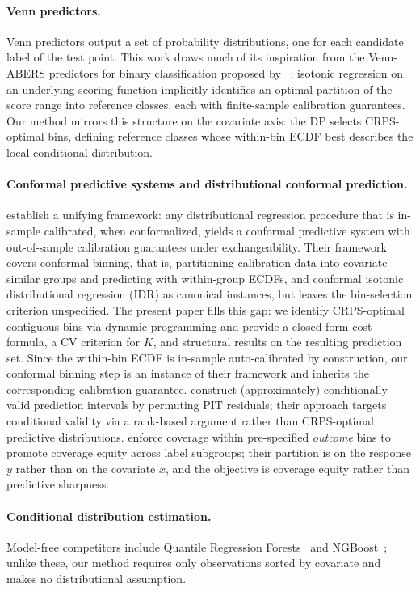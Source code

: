 \documentclass[11pt]{article}
\begin{document}
\paragraph{Venn predictors.}
Venn predictors output a set of probability distributions, one for
each candidate label of the test point.
This work draws much of its inspiration from the Venn-ABERS predictors for binary
classification proposed by ~\citet{VovkPetej2014}: isotonic regression 
on an underlying scoring function implicitly identifies an optimal partition of the 
score range into reference classes, each with finite-sample calibration guarantees.
Our method mirrors this structure on the covariate axis: the DP selects CRPS-optimal
bins, defining reference classes whose within-bin ECDF best describes the local
conditional distribution.

\paragraph{Conformal predictive systems and distributional conformal prediction.}
\citet{AllenEtAl2025} establish a unifying framework: any distributional
regression procedure that is in-sample calibrated, when conformalized, yields a conformal
predictive system with out-of-sample calibration guarantees under exchangeability.
Their framework covers conformal binning, that is, partitioning calibration data into
covariate-similar groups and predicting with within-group ECDFs, and conformal
isotonic distributional regression (IDR) as canonical instances, but leaves the
bin-selection criterion unspecified.
The present paper fills this gap: we identify CRPS-optimal contiguous bins via
dynamic programming and provide a closed-form cost formula, a CV criterion for $K$,
and structural results on the resulting prediction set.
Since the within-bin ECDF is in-sample auto-calibrated by construction, our
conformal binning step is an instance of their framework and inherits the
corresponding calibration guarantee.
\citet{ChernozhukovEtAl2021} construct (approximately) conditionally
valid prediction intervals by permuting PIT residuals; their approach targets conditional
validity via a rank-based argument rather than CRPS-optimal predictive distributions.
\citet{RandahlEtAl2026} enforce coverage within pre-specified
\emph{outcome} bins to promote coverage equity across label subgroups; their partition
is on the response $y$ rather than on the covariate $x$, and the objective is coverage
equity rather than predictive sharpness.

\paragraph{Conditional distribution estimation.}
Model-free competitors include Quantile Regression Forests~\citep{Meinshausen2006}
and NGBoost~\citep{DuanEtAl2020}; unlike these, our method requires only observations
sorted by covariate and makes no distributional assumption.
\end{document}
